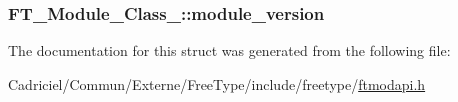 \hypertarget{struct_f_t___module___class___a5b649f1965c42fd8c54bbc370fbf60b4}{
\subsubsection[{module\-\_\-version}]{ F\-T\-\_\-\-Module\-\_\-\-Class\-\_\-\-::module\-\_\-version}}\label{struct_f_t___module___class___a5b649f1965c42fd8c54bbc370fbf60b4}


The documentation for this struct was generated from the following file\-:\begin{DoxyCompactItemize}
\item 
Cadriciel/\-Commun/\-Externe/\-Free\-Type/include/freetype/\hyperlink{ftmodapi_8h}{ftmodapi.\-h}\end{DoxyCompactItemize}
